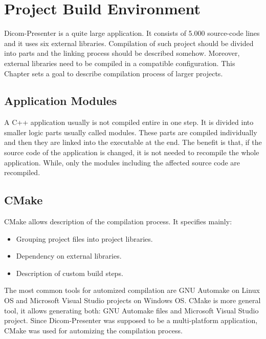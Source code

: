 \chapter{Project Build Environment}
\vspace{-10mm}

Dicom-Presenter is a quite large application. It consists of 5.000 source-code lines and it uses six external libraries. Compilation of such project should be divided into parts and the linking process should be described somehow. Moreover, external libraries need to be compiled in a compatible configuration. This Chapter sets a goal to describe compilation process of larger projects.

\section{Application Modules}

\label{library}

A C++ application usually is not compiled entire in one step. It is divided into smaller logic parts usually called modules. These parts are compiled individually and then they are linked into the executable at the end. The benefit is that, if the source code of the application is changed, it is not needed to recompile the whole application. While, only the modules including the affected source code are recompiled. 


\section{CMake}

CMake\cite{cmake_home} allows description of the compilation process. It specifies mainly:

\begin{itemize}
\item Grouping project files into project libraries.
\item Dependency on external libraries.
\item Description of custom build steps.
\end{itemize}

The most common tools for automized compilation are GNU Automake on Linux OS and Microsoft Visual Studio projects on Windows OS\cite{msvcompilation}. CMake is more general tool, it allows generating both: GNU Automake files and Microsoft Visual Studio project. Since Dicom-Presenter was supposed to be a multi-platform application, CMake was used for automizing the compilation process.

